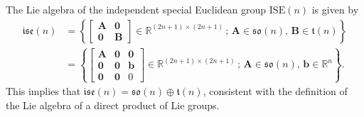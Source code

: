 \begin{example}
    The Lie algebra of the independent special Euclidean group $\text{ISE}(n)$ is given by
    \begin{align*}
        \mathfrak{ise}(n) &= \left\{\begin{bmatrix}
            \mathbf{A} & \mathbf{0}\\
            \mathbf{0} & \mathbf{B}
        \end{bmatrix} \in \mathbb{R}^{(2n+1)\times(2n+1)}\,;\, \mathbf{A}\in\mathfrak{so}(n),\,\mathbf{B}\in\mathfrak{t}(n)\right\}\\
        &= \left\{\begin{bmatrix}
            \mathbf{A} & \mathbf{0} & \mathbf{0}\\
            \mathbf{0} & \mathbf{0} & \mathbf{b}\\
            \mathbf{0} & \mathbf{0} & 0
        \end{bmatrix} \in \mathbb{R}^{(2n+1)\times(2n+1)}\,;\, \mathbf{A}\in\mathfrak{so}(n),\,\mathbf{b}\in\mathbb{R}^n\right\}.
    \end{align*}
    This implies that $\mathfrak{ise}(n) = \mathfrak{so}(n)\oplus\mathfrak{t}(n)$, consistent with the definition of the Lie algebra of a direct product of Lie groups.
\end{example}
